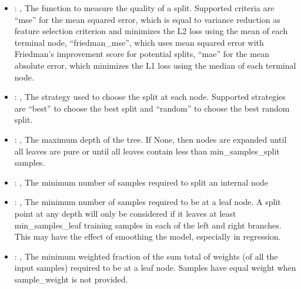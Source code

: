 \begin{itemize}
    \item {}: , 
      The function to measure the quality of a split. Supported criteria are ``mse'' for the mean
      squared error,                                                  which is equal to variance
      reduction as feature selection criterion and minimizes the L2 loss using the mean of each
      terminal node, ``friedman\_mse'', which uses mean squared error with Friedman's improvement
      score for potential splits,                                                  ``mae'' for the
      mean absolute error, which minimizes the L1 loss using the median of each terminal node.

    \item {}: , 
      The strategy used to choose the split at each node. Supported strategies are ``best''
      to choose the best split and ``random'' to choose the best random split.

    \item {}: , 
      The maximum depth of the tree. If None, then nodes are expanded until all leaves are pure
      or until all leaves contain less than min\_samples\_split samples.

    \item {}: , 
      The minimum number of samples required to split an internal node

    \item {}: , 
      The minimum number of samples required to be at a leaf node. A split point at any
      depth will only be considered if it leaves at least min\_samples\_leaf training samples in
      each                                                  of the left and right branches. This may
      have the effect of smoothing the model, especially
      in regression.

    \item {}: , 
      The minimum weighted fraction of the sum total of weights (of all the input samples)
      required to be at a leaf node. Samples have equal weight when sample\_weight is not provided.


\end{itemize}
